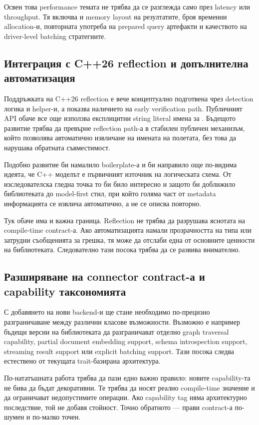 Освен това performance темата не трябва да се разглежда само през latency или throughput. Тя включва и memory layout на резултатите, броя временни allocation-и, повторната употреба на prepared query артефакти и качеството на driver-level batching стратегиите.

\subsection{Интеграция с C++26 reflection и допълнителна автоматизация}

Поддръжката на C++26 reflection е вече концептуално подготвена чрез detection логика и helper-и, а  показва наличието на early verification path. Публичният API обаче все още използва експлицитни string literal имена за . Бъдещото развитие трябва да превърне reflection path-а в стабилен публичен механизъм, който позволява автоматично извличане на имената на полетата, без това да нарушава обратната съвместимост.

Подобно развитие би намалило boilerplate-а и би направило още по-видима идеята, че C++ моделът е първичният източник на логическата схема. От изследователска гледна точка то би било интересно и защото би доближило библиотеката до model-first стил, при който голяма част от metadata информацията се извлича автоматично, а не се описва повторно.

Тук обаче има и важна граница. Reflection не трябва да разрушава яснотата на compile-time contract-а. Ако автоматизацията намали прозрачността на типа или затрудни съобщенията за грешка, тя може да отслаби една от основните ценности на библиотеката. Следователно тази посока трябва да се развива внимателно.

\subsection{Разширяване на connector contract-а и capability таксономията}

С добавянето на нови backend-и ще стане необходимо по-прецизно разграничаване между различни класове възможности. Възможно е например бъдещи версии на библиотеката да разграничават отделно graph traversal capability, partial document embedding support, schema introspection support, streaming result support или explicit batching support. Тази посока следва естествено от текущата trait-базирана архитектура.

По-нататъшната работа трябва да пази едно важно правило: новите capability-та не бива да бъдат декоративни. Те трябва да носят реално compile-time значение и да ограничават недопустимите операции. Ако capability tag няма архитектурно последствие, той не добавя стойност. Точно обратното --- прави contract-а по-шумен и по-малко точен.

